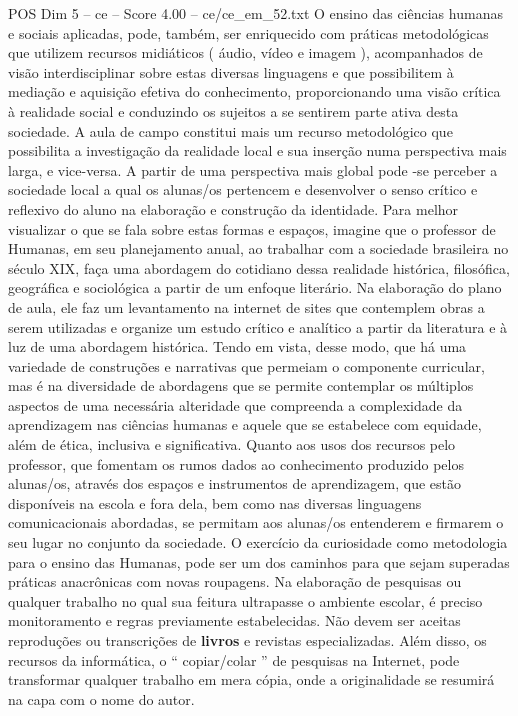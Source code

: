 \begin{textsample}{POS Dim 5 – ce – Score 4.00 – ce/ce\_em\_52.txt}
O ensino das ciências humanas e sociais aplicadas, pode, também, ser enriquecido com práticas metodológicas que utilizem recursos midiáticos ( áudio, vídeo e imagem ), acompanhados de visão interdisciplinar sobre estas diversas linguagens e que possibilitem à mediação e aquisição efetiva do conhecimento, proporcionando uma visão crítica à realidade social e conduzindo os sujeitos a se sentirem parte ativa desta sociedade.
A aula de campo constitui mais um recurso metodológico que possibilita a investigação da realidade local e sua inserção numa perspectiva mais larga, e vice-versa.
A partir de uma perspectiva mais global pode -se perceber a sociedade local a qual os alunas/os pertencem e desenvolver o senso crítico e reflexivo do aluno na elaboração e construção da identidade.
Para melhor visualizar o que se fala sobre estas formas e espaços, imagine que o professor de Humanas, em seu planejamento anual, ao trabalhar com a sociedade brasileira no século XIX, faça uma abordagem do cotidiano dessa realidade histórica, filosófica, geográfica e sociológica a partir de um enfoque literário.
Na elaboração do plano de aula, ele faz um levantamento na internet de sites que contemplem obras a serem utilizadas e organize um estudo crítico e analítico a partir da literatura e à luz de uma abordagem histórica.
Tendo em vista, desse modo, que há uma variedade de construções e narrativas que permeiam o componente curricular, mas é na diversidade de abordagens que se permite contemplar os múltiplos aspectos de uma necessária alteridade que compreenda a complexidade da aprendizagem nas ciências humanas e aquele que se estabelece com equidade, além de ética, inclusiva e significativa.
Quanto aos usos dos recursos pelo professor, que fomentam os rumos dados ao conhecimento produzido pelos alunas/os, através dos espaços e instrumentos de aprendizagem, que estão disponíveis na escola e fora dela, bem como nas diversas linguagens comunicacionais abordadas, se permitam aos alunas/os entenderem e firmarem o seu lugar no conjunto da sociedade.
O exercício da curiosidade como metodologia para o ensino das Humanas, pode ser um dos caminhos para que sejam superadas práticas anacrônicas com novas roupagens.
Na elaboração de pesquisas ou qualquer trabalho no qual sua feitura ultrapasse o ambiente escolar, é preciso monitoramento e regras previamente estabelecidas.
Não devem ser aceitas reproduções ou transcrições de \textbf{livros} e revistas especializadas.
Além disso, os recursos da informática, o “ copiar/colar ” de pesquisas na Internet, pode transformar qualquer trabalho em mera cópia, onde a originalidade se resumirá na capa com o nome do autor.

\end{textsample}
